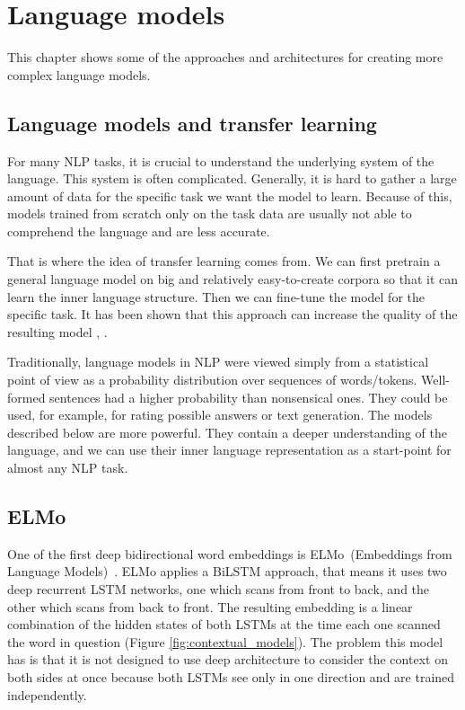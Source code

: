 \documentclass[
  printed, %
  color,   %
  table,   %
  oneside, %
  lof,     %
  lot,     %
]{fithesis3}
\begin{document}

\chapter{Language models}
This chapter shows some of the approaches and architectures for creating more complex language models.

\section{Language models and transfer learning}
For many NLP tasks, it is crucial to understand the underlying system of the language. This system is often complicated. Generally, it is hard to gather a large amount of data for the specific task we want the model to learn. Because of this, models trained from scratch only on the task data are usually not able to comprehend the language and are less accurate.

That is where the idea of transfer learning comes from. We can first pretrain a general language model on big and relatively easy-to-create corpora so that it can learn the inner language structure. Then we can fine-tune the model for the specific task. It has been shown that this approach can increase the quality of the resulting model \parencite{transfer1}, \parencite{transfer2}.

Traditionally, language models in NLP were viewed simply from a statistical point of view as a probability distribution over sequences of words/tokens. Well-formed sentences had a higher probability than nonsensical ones. They could be used, for example, for rating possible answers or text generation. The models described below are more powerful. They contain a deeper understanding of the language, and we can use their inner language representation as a start-point for almost any NLP task.

 \section{ELMo}
One of the first deep bidirectional word embeddings is ELMo~(Embeddings from Language Models)~\parencite{elmo}. ELMo applies a BiLSTM approach, that means it uses two deep recurrent LSTM networks, one which scans from front to back, and the other which scans from back to front. The resulting embedding is a linear combination of the hidden states of both LSTMs at the time each one scanned the word in question (Figure \ref{fig:contextual_models}). The problem this model has is that it is not designed to use deep architecture to consider the context on both sides at once because both LSTMs see only in one direction and are trained independently. 
\end{document}
